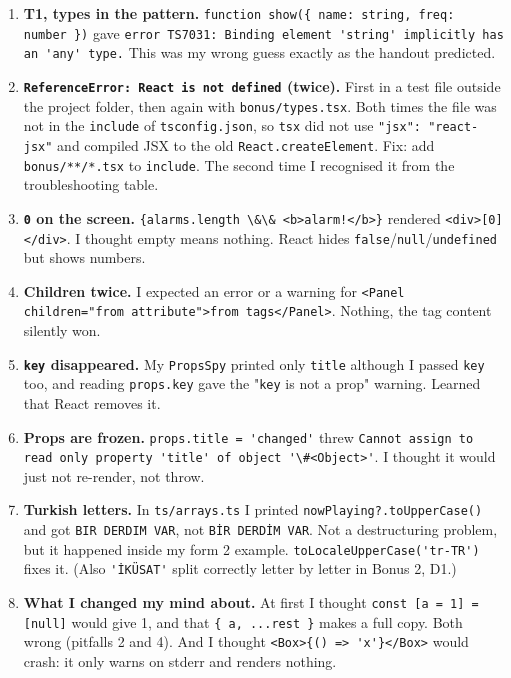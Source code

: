 \begin{enumerate}
\item
  \textbf{T1, types in the pattern.} \passthrough{\lstinline!function show(\{ name: string, freq: number \})!} gave \passthrough{\lstinline!error TS7031: Binding element 'string' implicitly has an 'any' type.!} This was my wrong guess exactly as the handout predicted.
\item
  \textbf{\passthrough{\lstinline!ReferenceError: React is not defined!} (twice).} First in a test file outside the project folder, then again with \passthrough{\lstinline!bonus/types.tsx!}. Both times the file was not in the \passthrough{\lstinline!include!} of \passthrough{\lstinline!tsconfig.json!}, so \passthrough{\lstinline!tsx!} did not use \passthrough{\lstinline!"jsx": "react-jsx"!} and compiled JSX to the old \passthrough{\lstinline!React.createElement!}. Fix: add \passthrough{\lstinline!bonus/**/*.tsx!} to \passthrough{\lstinline!include!}. The second time I recognised it from the troubleshooting table.
\item
  \textbf{\passthrough{\lstinline!0!} on the screen.} \passthrough{\lstinline"\{alarms.length \&\& <b>alarm!</b>\}"} rendered \passthrough{\lstinline!<div>[0]</div>!}. I thought empty means nothing. React hides \passthrough{\lstinline!false!}/\passthrough{\lstinline!null!}/\passthrough{\lstinline!undefined!} but shows numbers.
\item
  \textbf{Children twice.} I expected an error or a warning for \passthrough{\lstinline!<Panel children="from attribute">from tags</Panel>!}. Nothing, the tag content silently won.
\item
  \textbf{\passthrough{\lstinline!key!} disappeared.} My \passthrough{\lstinline!PropsSpy!} printed only \passthrough{\lstinline!title!} although I passed \passthrough{\lstinline!key!} too, and reading \passthrough{\lstinline!props.key!} gave the "\passthrough{\lstinline!key!} is not a prop" warning. Learned that React removes it.
\item
  \textbf{Props are frozen.} \passthrough{\lstinline!props.title = 'changed'!} threw \passthrough{\lstinline!Cannot assign to read only property 'title' of object '\#<Object>'!}. I thought it would just not re-render, not throw.
\item
  \textbf{Turkish letters.} In \passthrough{\lstinline!ts/arrays.ts!} I printed \passthrough{\lstinline!nowPlaying?.toUpperCase()!} and got \passthrough{\lstinline!BIR DERDIM VAR!}, not \passthrough{\lstinline!BİR DERDİM VAR!}. Not a destructuring problem, but it happened inside my form 2 example. \passthrough{\lstinline!toLocaleUpperCase('tr-TR')!} fixes it. (Also \passthrough{\lstinline!'İKÜSAT'!} split correctly letter by letter in Bonus 2, D1.)
\item
  \textbf{What I changed my mind about.} At first I thought \passthrough{\lstinline!const [a = 1] = [null]!} would give 1, and that \passthrough{\lstinline!\{ a, ...rest \}!} makes a full copy. Both wrong (pitfalls 2 and 4). And I thought \passthrough{\lstinline!<Box>\{() => 'x'\}</Box>!} would crash: it only warns on stderr and renders nothing.
\end{enumerate}

